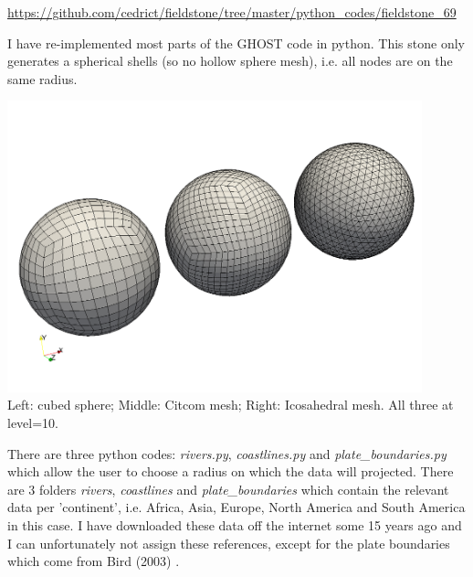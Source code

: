 
\url{https://github.com/cedrict/fieldstone/tree/master/python_codes/fieldstone_69}



I have re-implemented most parts of the GHOST code \cite{thie18} in python. 
This stone only generates a spherical shells (so no hollow sphere mesh), 
i.e. all nodes are on the same radius. 

\begin{center}
\includegraphics[width=12cm]{python_codes/fieldstone_69/images/shells}\\
{\captionfont Left: cubed sphere; Middle: Citcom mesh; Right: Icosahedral mesh. 
All three at level=10.}
\end{center}

There are three python codes: {\sl rivers.py}, {\sl coastlines.py} and {\sl plate\_boundaries.py} which allow the user to choose 
a radius on which the data will projected. There are 3 folders {\sl rivers}, {\sl coastlines} and {\sl plate\_boundaries} which contain the relevant data per 'continent', i.e. 
Africa, Asia, Europe, North America and South America in this case. 
I have downloaded these data off the internet some 15 years ago and I can unfortunately not assign these references, except 
for the plate boundaries which come from Bird (2003) \cite{bird03}.

